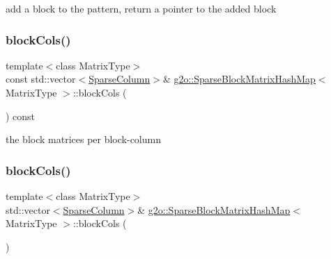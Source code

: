 add a block to the pattern, return a pointer to the added block \mbox{\label{classg2o_1_1_sparse_block_matrix_hash_map_a07d4746ccda502bd815a09aefe42eac6}} 
\subsubsection{\texorpdfstring{block\+Cols()}{blockCols()}\hspace{0.1cm}{\footnotesize\ttfamily [1/2]}}
{\footnotesize\ttfamily template$<$class Matrix\+Type$>$ \\
const std\+::vector$<$\mbox{\hyperlink{classg2o_1_1_sparse_block_matrix_hash_map_ae364a722296b90e32dd6c3a8fbeb49ae}{Sparse\+Column}}$>$\& \mbox{\hyperlink{classg2o_1_1_sparse_block_matrix_hash_map}{g2o\+::\+Sparse\+Block\+Matrix\+Hash\+Map}}$<$ Matrix\+Type $>$\+::block\+Cols (\begin{DoxyParamCaption}{ }\end{DoxyParamCaption}) const\hspace{0.3cm}{\ttfamily [inline]}}



the block matrices per block-\/column 

\mbox{\label{classg2o_1_1_sparse_block_matrix_hash_map_a2879ea0d9b530e7c522c912dff279b5d}} 
\subsubsection{\texorpdfstring{block\+Cols()}{blockCols()}\hspace{0.1cm}{\footnotesize\ttfamily [2/2]}}
{\footnotesize\ttfamily template$<$class Matrix\+Type$>$ \\
std\+::vector$<$\mbox{\hyperlink{classg2o_1_1_sparse_block_matrix_hash_map_ae364a722296b90e32dd6c3a8fbeb49ae}{Sparse\+Column}}$>$\& \mbox{\hyperlink{classg2o_1_1_sparse_block_matrix_hash_map}{g2o\+::\+Sparse\+Block\+Matrix\+Hash\+Map}}$<$ Matrix\+Type $>$\+::block\+Cols (\begin{DoxyParamCaption}{ }\end{DoxyParamCaption})\hspace{0.3cm}{\ttfamily [inline]}}

